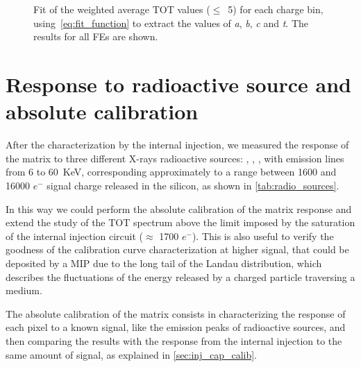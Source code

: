 \begin{figure}[h!]
\centering
{}\quad
{}\\
\quad
{}\\
\caption{Fit of the weighted average TOT values ($\le$~5) for each charge bin, using~\autoref{eq:fit_function} to extract the values of \textit{a}, \textit{b}, \textit{c} and \textit{t}. The results for all FEs are shown.}
\label{fig:totfit_cut}
\end{figure}




\newpage
\section{Response to radioactive source and absolute calibration} \label{sec:source_ana}


After the characterization by the internal injection, we measured the response of the matrix to three different X-rays radioactive sources: , , , with emission lines from 6 to \SI{60}{KeV}, corresponding approximately to a range between 1600 and 16000 $e^{-}$ signal charge released in the silicon, as shown in \autoref{tab:radio_sources}.

In this way we could perform the absolute calibration of the matrix response and extend the study of the TOT spectrum above the limit imposed by the saturation of the internal injection circuit ($\approx$ 1700 $e^{-}$). This is also useful to verify the goodness of the calibration curve characterization at higher signal, that could be deposited by a MIP due to the long tail of the Landau distribution, which describes the fluctuations of the energy released by a charged particle traversing a medium. 

The absolute calibration of the matrix consists in characterizing the response of each pixel to a known signal, like the emission peaks of radioactive sources, and then comparing the results with the response from the internal injection to the same amount of signal, as explained in \autoref{sec:inj_cap_calib}. 

